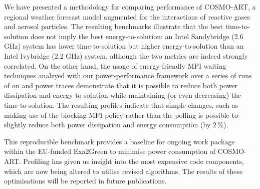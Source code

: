 We  have   presented  a  methodology  for   comparing  performance  of
COSMO-ART,  a  regional  weather  forecast  model  augmented  for  the
interactions of  reactive gases and aerosol  particles.  The resulting
benchmarks illustrate  that the  best time-to-solution does  not imply
the best energy-to-solution: an Intel Sandybridge (2.6 GHz) system has
lower  time-to-solution but  higher energy-to-solution  than  an Intel
Ivybridge  (2.2  GHz) system,  although  the  two  metrics are  indeed
strongly  correlated. On the other hand, the usage of energy-friendly MPI waiting techniques analzyed with our power-performance framework over a series of runs of \cosmoart on \tinto and
power traces demonstrate that it is possible to reduce both
power dissipation and energy-to-solution while maintaining (or even decreasing) the time-to-solution. The  resulting profiles indicate that simple
changes, such as making use of the blocking MPI policy rather
than the polling is possible to slightly reduce both power dissipation and energy consumption (by 2\,\%).

This  reproducible  benchmark provides  a  baseline  for ongoing  work
package within  the EU-funded Exa2Green to  minimise power consumption
of COSMO-ART. Profiling  has given us insight into  the most expensive
code  components,  which are  now  being  altered  to utilise  revised
algorithms.  The  results of these  optimisations will be  reported in
future publications.
